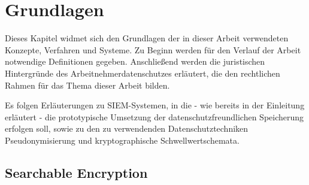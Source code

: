 \chapter{Grundlagen}

\label{cha_basics}

Dieses Kapitel widmet sich den Grundlagen der in dieser Arbeit verwendeten Konzepte, Verfahren und Systeme. Zu Beginn werden für den Verlauf der Arbeit notwendige Definitionen gegeben. Anschließend werden die juristischen Hintergründe des Arbeitnehmerdatenschutzes erläutert, die den rechtlichen Rahmen für das Thema dieser Arbeit bilden. 

Es folgen Erläuterungen zu SIEM-Systemen, in die - wie bereits in der Einleitung erläutert - die prototypische Umsetzung der datenschutzfreundlichen Speicherung erfolgen soll, sowie zu den zu verwendenden Datenschutztechniken  Pseudonymisierung und kryptographische Schwellwertschemata.











\section{Searchable Encryption}

